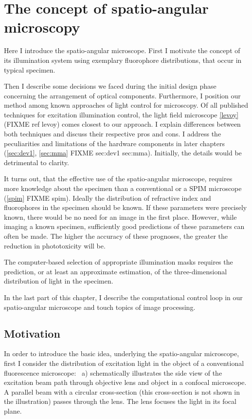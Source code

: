 \chapter{The concept of spatio-angular microscopy}
\label{sec:concept}
\begin{summary}
  Here I introduce the spatio-angular microscope. First I motivate
  the concept of its illumination system using exemplary fluorophore
  distributions, that occur in typical specimen.

  Then I describe some decisions we faced during the initial design
  phase concerning the arrangement of optical components. Furthermore,
  I position our method among known approaches of light control for
  microscopy. Of all published techniques for excitation illumination
  control, the light field microscope \ref{levoy} (FIXME ref levoy)
  comes closest to our approach.  I explain differences between both
  techniques and discuss their respective pros and cons.  I address
  the peculiarities and limitations of the hardware components in
  later chapters (\ref{sec:dev1}, \ref{sec:mma} FIXME sec:dev1
  sec:mma).  Initially, the details would be detrimental to clarity.

  It turns out, that the effective use of the spatio-angular
  microscope, requires more knowledge about the specimen than a
  conventional or a SPIM microscope (\ref{spim} FIXME spim). Ideally the
  distribution of refractive index and fluorophores in the specimen
  should be known. If these parameters were precisely known, there
  would be no need for an image in the first place. However, while
  imaging a known specimen, sufficiently good predictions of these
  parameters can often be made. The higher the accuracy of these
  prognoses, the greater the reduction in phototoxicity will be.

  The computer-based selection of appropriate illumination masks
  requires the prediction, or at least an approximate estimation, of
  the three-dimensional distribution of light in the specimen.

  In the last part of this chapter, I describe the computational
  control loop in our spatio-angular
  microscope and touch topics of image processing.
\end{summary}
\section{Motivation}
In order to introduce the basic idea, underlying the spatio-angular
microscope, first I consider the distribution of excitation light in
the object of a conventional fluorescence microscope:
~a) schematically illustrates the side view
of the excitation beam path through objective lens and object in a
confocal microscope. A parallel beam with a circular cross-section
(this cross-section is not shown in the illustration) passes through
the lens. The lens focuses the light in its focal plane.

